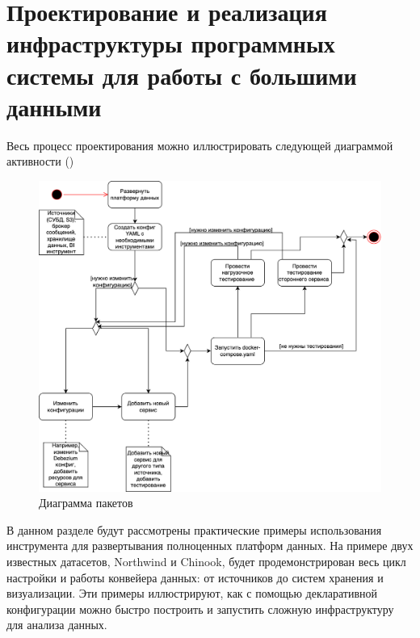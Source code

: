 \chapter{Проектирование и реализация инфраструктуры программных системы для работы с большими данными} \label{ch4}


Весь процесс проектирования можно иллюстрировать следующей диаграммой активности ()

\begin{figure}
  \center
  \includegraphics [scale=0.3] {my_folder/images/diagram_activity}
  \caption{Диаграмма пакетов}
  \label{fig:diagram_activity}
\end{figure}
\FloatBarrier
В данном разделе будут рассмотрены практические примеры использования инструмента для развертывания полноценных платформ данных. На примере двух известных датасетов, Northwind\cite{northwind} и Chinook\cite{chinook}, будет продемонстрирован весь цикл настройки и работы конвейера данных: от источников до систем хранения и визуализации. Эти примеры иллюстрируют, как с помощью декларативной конфигурации можно быстро построить и запустить сложную инфраструктуру для анализа данных.



